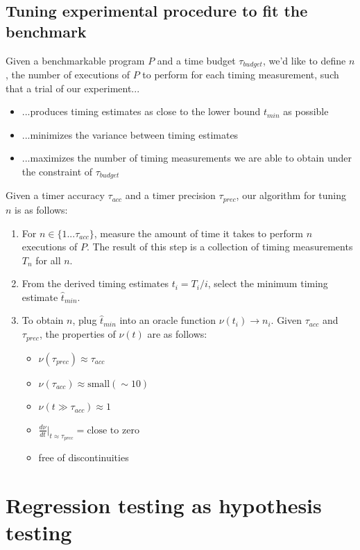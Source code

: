 \documentclass[conference]{IEEEtran}
\begin{document}
\subsection{Tuning experimental procedure to fit the benchmark}

Given a benchmarkable program $P$ and a time budget $\tau_{budget}$, we'd like to define $n$, the number of executions of $P$ to perform for each timing measurement, such that a trial of our experiment...

\begin{itemize}
    \item ...produces timing estimates as close to the lower bound $t_{min}$ as possible
    \item ...minimizes the variance between timing estimates
    \item ...maximizes the number of timing measurements we are able to obtain under the constraint of $\tau_{budget}$
\end{itemize}

Given a timer accuracy $\tau_{acc}$ and a timer precision $\tau_{prec}$, our algorithm for tuning $n$ is as follows:

\begin{enumerate}
\item For $n \in \{1...\tau_{acc}\}$, measure the amount of time it takes to perform $n$ executions of $P$. The result of this step is a collection of timing measurements $T_n$ for all $n$.
\item From the derived timing estimates $t_i = T_i / i$, select the minimum timing estimate $\hat{t}_{min}$.
\item To obtain $n$, plug $\hat{t}_{min}$ into an oracle function $\nu(t_i) \to n_i$. Given $\tau_{acc}$ and $\tau_{prec}$, the properties of $\nu(t)$ are as follows:
\begin{itemize}
    \item $\nu(\tau_{prec}) \approx \tau_{acc}$
    \item $\nu(\tau_{acc}) \approx \text{small} (\sim 10)$
    \item $\nu(t \gg \tau_{acc}) \approx 1$
    \item $\frac{d\nu}{dt}\big|_{t \approx \tau_{prec}} = \text{close to zero}$
    \item free of discontinuities 
\end{itemize}
\end{enumerate}


\section{Regression testing as hypothesis testing}
\end{document}
